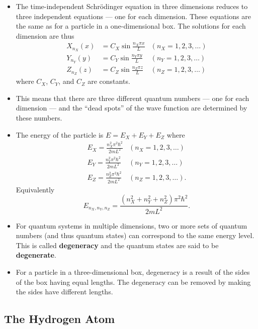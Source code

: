 \documentclass{article}
\begin{document}
\begin{itemize}
  \item The time-independent Schrödinger equation in three dimensions reduces to three independent equations — one for each dimension. These equations are the same as for a particle in a one-dimensional box. The solutions for each dimension are thus \begin{align*}
          X_{n_X}(x) & = C_X \sin \frac{n_X \pi x}{L} & (n_X = 1, 2, 3, \ldots) \\
          Y_{n_Y}(y) & = C_Y \sin \frac{n_Y \pi y}{L} & (n_Y = 1, 2, 3, \ldots) \\
          Z_{n_Z}(z) & = C_Z \sin \frac{n_Z \pi z}{L} & (n_Z = 1, 2, 3, \ldots)
        \end{align*} where $C_X$, $C_Y$, and $C_Z$ are constants.

  \item This means that there are three different quantum numbers — one for each dimension — and the ``dead spots'' of the wave function are determined by these numbers.

  \item The energy of the particle is $E = E_X + E_Y + E_Z$ where \begin{align*}
          E_X = \frac{n_X^2 \pi^2 \hbar^2}{2 m L^2} & (n_X = 1, 2, 3, \ldots)  \\
          E_Y = \frac{n_Y^2 \pi^2 \hbar^2}{2 m L^2} & (n_Y = 1, 2, 3, \ldots)  \\
          E_Z = \frac{n_Z^2 \pi^2 \hbar^2}{2 m L^2} & (n_Z = 1, 2, 3, \ldots).
        \end{align*} Equivalently \[E_{n_X,n_Y,n_Z} = \frac{(n_X^2 + n_Y^2 + n_Z^2) \pi^2 \hbar^2}{2 m L^2}.\]

  \item For quantum systems in multiple dimensions, two or more sets of quantum numbers (and thus quantum states) can correspond to the same energy level. This is called \textbf{degeneracy} and the quantum states are said to be \textbf{degenerate}.

  \item For a particle in a three-dimensional box, degeneracy is a result of the sides of the box having equal lengths. The degeneracy can be removed by making the sides have different lengths.
\end{itemize}

\subsection{The Hydrogen Atom}
\end{document}
